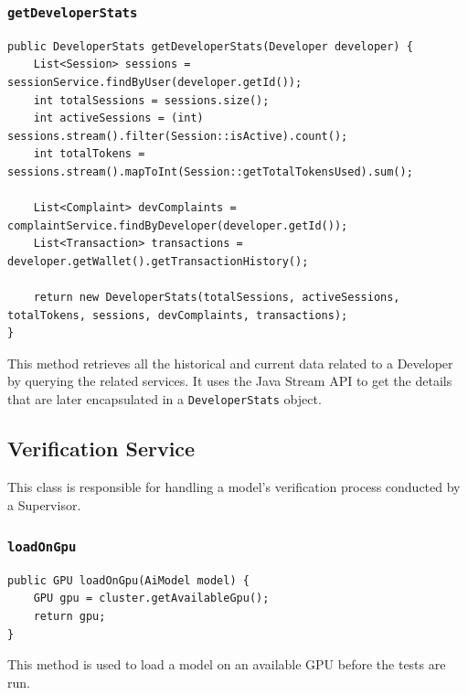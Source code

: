 \documentclass[a4paper,11pt]{report}
\begin{document}
\subsubsection{\texttt{getDeveloperStats}}
\begin{lstlisting}[label={lst:getdeveloperstats}]
public DeveloperStats getDeveloperStats(Developer developer) {
    List<Session> sessions = sessionService.findByUser(developer.getId());
    int totalSessions = sessions.size();
    int activeSessions = (int) sessions.stream().filter(Session::isActive).count();
    int totalTokens = sessions.stream().mapToInt(Session::getTotalTokensUsed).sum();

    List<Complaint> devComplaints = complaintService.findByDeveloper(developer.getId());
    List<Transaction> transactions = developer.getWallet().getTransactionHistory();

    return new DeveloperStats(totalSessions, activeSessions, totalTokens, sessions, devComplaints, transactions);
}
\end{lstlisting}

This method retrieves all the historical and current data related to a Developer by querying the related services. It uses the Java Stream API to get the details that are later encapsulated in a \texttt{DeveloperStats} object.

\subsection{Verification Service}
\label{subsec:VerificationService}
This class is responsible for handling a model's verification process conducted by a Supervisor. 

\subsubsection{\texttt{loadOnGpu}}
\begin{lstlisting}[label={lst:loadongpu}]
public GPU loadOnGpu(AiModel model) {
    GPU gpu = cluster.getAvailableGpu();
    return gpu;
}
\end{lstlisting}

This method is used to load a model on an available GPU before the tests are run.

\clearpage
\end{document}
